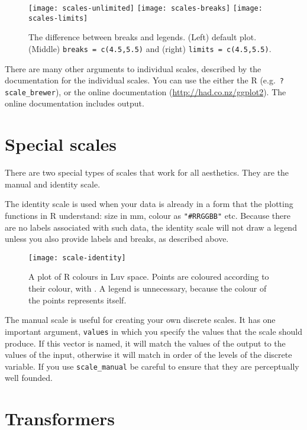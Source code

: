 \begin{figure}[htbp]
  \centering
    \texttt{[image: scales-unlimited]}%
    \texttt{[image: scales-breaks]}%
    \texttt{[image: scales-limits]}
  \caption{The difference between breaks and legends.  (Left) default plot.  (Middle)  {\tt breaks = c(4.5,5.5)} and (right) {\tt limits = c(4.5,5.5)}.}
  \label{fig:breaks_vs_legends}
\end{figure}

There are many other arguments to individual scales, described by the documentation for the individual scales.  You can use the either the R (e.g.\ {\tt ?scale\_brewer}), or the online documentation (\url{http://had.co.nz/ggplot2}).  The online documentation includes output.

\section{Special scales}
\label{sec:scale_special}

There are two special types of scales that work for all aesthetics.  They are the manual and identity scale.  

The identity scale is used when your data is already in a form that the plotting functions in R understand: size in mm, colour as \verb|"#RRGGBB"| etc. Because there are no labels associated with such data, the identity scale will not draw a legend unless you also provide labels and breaks, as described above. 

\begin{figure}[htbp]
  \centering
    \texttt{[image: scale-identity]}
  \caption{A plot of R colours in Luv space.  Points are coloured according to their colour, with .  A legend is unnecessary, because the colour of the points represents itself.}
  \label{fig:scale-identity}
\end{figure}

The manual scale is useful for creating your own discrete scales.  It has one important argument, \verb|values| in which you specify the values that the scale should produce.  If this vector is named, it will match the values of the output to the values of the input, otherwise it will match in order of the levels of the discrete variable.  If you use \verb|scale_manual| be careful to ensure that they are perceptually well founded.

\section{Transformers}
\label{sec:trans}

